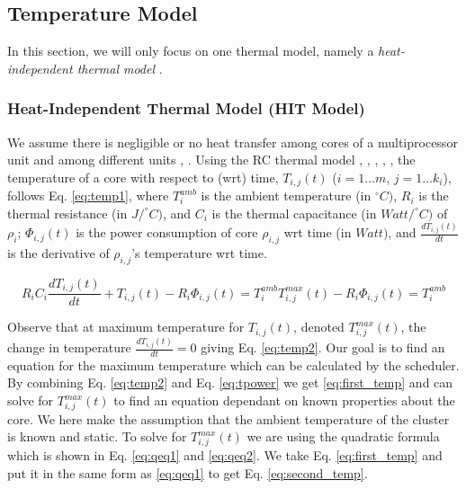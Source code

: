 \documentclass[conference]{IEEEtran}
\begin{document}
\subsection{Temperature Model}

In this section, we will only focus on one thermal model, namely a \emph{heat-independent thermal model} \cite{Quan10}.

\subsubsection{Heat-Independent Thermal Model (HIT Model)}

We assume there is negligible or no heat transfer among cores of a multiprocessor unit and among different units \cite{Quan10}, \cite{Chaturvedi10}.
Using the RC thermal model
\cite{Chen09}, \cite{Chantem10}, \cite{Quan10},  \cite{Fisher09}, \cite{Chaturvedi10}, the temperature of a core %
with respect to (wrt) time,
$T_{i,j}(t)$ ($i=1\ldots m$, $j=1\ldots k_i$), follows
Eq. \ref{eq:temp1}, where $T_i^{amb}$ is the ambient temperature (in $^\circ C)$,
$R_i$ is the thermal resistance (in $J/ ^\circ C)$, and $C_i$ is the thermal capacitance (in $Watt/ ^\circ C)$ of $\rho_i$; $\Phi_{i,j}(t)$ is the power consumption of core $\rho_{i,j}$  wrt time (in $Watt)$,
and $\frac{dT_{i,j}(t)}{dt}$ is the derivative of $\rho_{i,j}$'s temperature wrt time.


\vspace{-0.1in}

\begin{subequations}\label{eq:temp}
	\begin{equation}
		R_iC_i\frac{dT_{i,j}(t)}{dt} + T_{i,j}(t) - R_i\Phi_{i,j}(t) = T_i^{amb} \label{eq:temp1}
	\end{equation}

	\begin{equation}
		T^{max}_{i,j}(t) - R_i\Phi_{i,j}(t) = T_i^{amb} \label{eq:temp2}
	\end{equation}
\end{subequations}

Observe that at maximum temperature for $T_{i,j}(t)$, denoted $T^{max}_{i,j}(t)$, the change in temperature $\frac{dT_{i,j}(t)}{dt} = 0$ giving Eq. \ref{eq:temp2}. Our goal is to find an equation for the maximum temperature which can be calculated by the scheduler. By combining Eq. \ref{eq:temp2} and Eq. \ref{eq:tpower} we get \ref{eq:first_temp} and can solve for $T^{max}_{i,j}(t)$ to find an equation dependant on known properties about the core. We here make the assumption that the ambient temperature of the cluster is known and static. To solve for $T^{max}_{i,j}(t)$ we are using the quadratic formula which is shown in Eq. \ref{eq:qeq1} and \ref{eq:qeq2}. We take Eq. \ref{eq:first_temp} and put it in the same form as \ref{eq:qeq1} to get Eq. \ref{eq:second_temp}.
\end{document}
